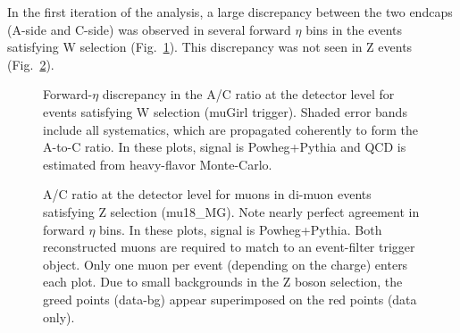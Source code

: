 
In the first iteration of the analysis, a large discrepancy between the two endcaps (A-side and C-side) was observed in several forward $\eta$ bins in the events satisfying W selection (Fig.~\ref{fig:Wmunu:AC_old_W}). This discrepancy was not seen in Z events (Fig.~\ref{fig:Wmunu:AC_old_Z}).

\begin{figure}[phtb]
  \begin{center}
 \caption{ Forward-$\eta$ discrepancy in the A/C ratio at the detector level for events satisfying W selection (muGirl trigger). Shaded error bands include all systematics, which are propagated coherently to form the A-to-C ratio. In these plots, signal is Powheg+Pythia and QCD is estimated from heavy-flavor Monte-Carlo. }
 \label{fig:Wmunu:AC_old_W}
 \end{center}
\end{figure}

\begin{figure}[phtb]
  \begin{center}
 \caption{ A/C ratio at the detector level for muons in di-muon events satisfying Z selection (mu18\_MG). Note nearly perfect agreement in forward $\eta$ bins. In these plots, signal is Powheg+Pythia. Both reconstructed muons are required to match to an event-filter trigger object. Only one muon per event (depending on the charge) enters each plot. Due to small backgrounds in the Z boson selection, the greed points (data-bg) appear superimposed on the red points (data only). }
 \label{fig:Wmunu:AC_old_Z}
 \end{center}
\end{figure}

